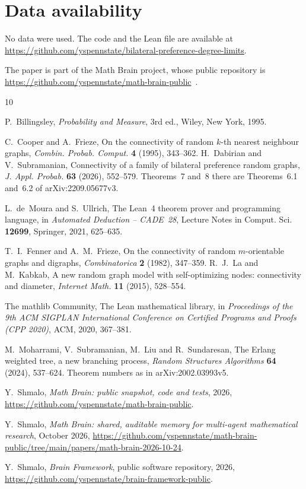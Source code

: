 \documentclass[11pt]{amsart}
\theoremstyle{remark}
\numberwithin{equation}{section}
\newcommand{\1}{\mathbf 1}
\begin{document}
\section*{Data availability}
No data were used. The code and the Lean file are available at\\ \url{https://github.com/yspennstate/bilateral-preference-degree-limits}.

The paper is part of the Math Brain project, whose public repository is \url{https://github.com/yspennstate/math-brain-public}~\cite{MathBrainRepo}.

\begin{thebibliography}{10}

P.~Billingsley, \emph{Probability and Measure}, 3rd ed., Wiley, New York, 1995.

C.~Cooper and A.~Frieze, On the connectivity of random $k$-th nearest neighbour graphs, \emph{Combin. Probab. Comput.} \textbf{4} (1995), 343--362.
H.~Dabirian and V.~Subramanian, Connectivity of a family of bilateral preference random graphs, \emph{J. Appl. Probab.} \textbf{63} (2026), 552--579. Theorems~7 and~8 there are Theorems~6.1 and~6.2 of arXiv:2209.05677v3.

L.~de~Moura and S.~Ullrich, The Lean~4 theorem prover and programming language, in \emph{Automated Deduction -- CADE~28}, Lecture Notes in Comput. Sci. \textbf{12699}, Springer, 2021, 625--635.

T.~I.~Fenner and A.~M.~Frieze, On the connectivity of random $m$-orientable graphs and digraphs, \emph{Combinatorica} \textbf{2} (1982), 347--359.
R.~J.~La and M.~Kabkab, A new random graph model with self-optimizing nodes: connectivity and diameter, \emph{Internet Math.} \textbf{11} (2015), 528--554.

The mathlib Community, The Lean mathematical library, in \emph{Proceedings of the 9th ACM SIGPLAN International Conference on Certified Programs and Proofs (CPP 2020)}, ACM, 2020, 367--381.

M.~Moharrami, V.~Subramanian, M.~Liu and R.~Sundaresan, The Erlang weighted tree, a new branching process, \emph{Random Structures Algorithms} \textbf{64} (2024), 537--624. Theorem numbers as in arXiv:2002.03993v5.

 Y.~Shmalo, \emph{Math Brain: public snapshot, code and tests}, 2026, \url{https://github.com/yspennstate/math-brain-public}.

 Y.~Shmalo, \emph{Math Brain: shared, auditable memory for multi-agent mathematical research}, October 2026, \url{https://github.com/yspennstate/math-brain-public/tree/main/papers/math-brain-2026-10-24}.

 Y.~Shmalo, \emph{Brain Framework}, public software repository, 2026, \url{https://github.com/yspennstate/brain-framework-public}.

\end{thebibliography}
\end{document}
